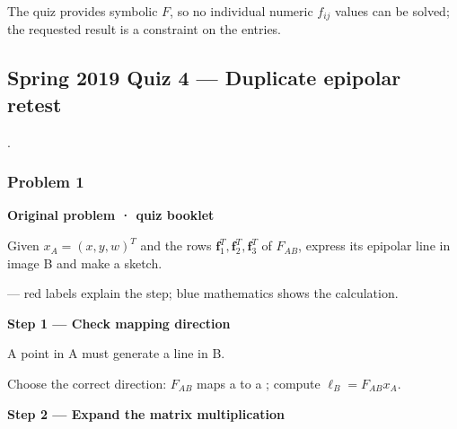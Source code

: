 \documentclass[letterpaper,11pt,english,openany,oneside]{jupyterBook}
\begin{document}
\par

\sphinxAtStartPar
{} The quiz provides symbolic \(F\), so no individual numeric \(f_{ij}\) values can be solved; the requested result is a constraint on the entries.


\subsection{Spring 2019 Quiz 4 — Duplicate epipolar retest}
\label{\detokenize{lectures/lecture04/quiz-workbook:spring-2019-quiz-4-duplicate-epipolar-retest}}\label{\detokenize{lectures/lecture04/quiz-workbook:quiz-source-2}}
\sphinxAtStartPar
{} .


\subsubsection{Problem 1}
\label{\detokenize{lectures/lecture04/quiz-workbook:quiz-2-q1}}\label{\detokenize{lectures/lecture04/quiz-workbook:id1}}
\par\medskip\textbf{Original problem · quiz booklet}\par\smallskip

\sphinxAtStartPar
Given \(x_A=(x,y,w)^T\) and the rows \(\mathbf f_1^T,\mathbf f_2^T,\mathbf f_3^T\) of \(F_{AB}\), express its epipolar line in image B and make a sketch.

\par\medskip

\sphinxAtStartPar
{} — red labels explain the step; blue mathematics shows the calculation.

\par\medskip{}
{\color{QuizStepRed}\bfseries Step 1 — Check mapping direction}\par\smallskip

\sphinxAtStartPar
{} A point in A must generate a line in B.

\sphinxAtStartPar
Choose the correct direction: {\color{QuizMathBlue} \(F_{AB}\)} maps a  to a ; compute {\color{QuizMathBlue} \(\ell_B=F_{AB}x_A\)}.

\par

\par\medskip{}
{\color{QuizStepRed}\bfseries Step 2 — Expand the matrix multiplication}\par\smallskip
\end{document}
